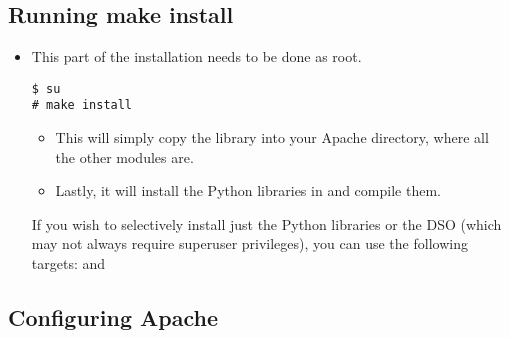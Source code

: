 \subsection{Running make install\label{inst-makeinstall}}

\begin{itemize}

\item
This part of the installation needs to be done as root. 
\begin{verbatim}
$ su
# make install
\end{verbatim}
                      
\begin{itemize}

\item
This will simply copy the library into your Apache 
directory, where all the other modules are.


\item
Lastly, it will install the Python libraries in  and
compile them. 

\end{itemize} 

 If you wish to selectively install just the Python libraries
or the DSO (which may not always require superuser
privileges), you can use the following  targets:
 and 

\end{itemize}

\subsection{Configuring Apache\label{inst-apacheconfig}}

